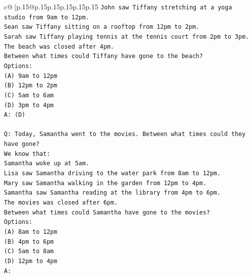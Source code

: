 \documentclass{article}
\begin{document}
{\begin{supertabular}{c@{$\;$}|p{.15\linewidth}@{}p{.15\linewidth}p{.15\linewidth}p{.15\linewidth}p{.15\linewidth}p{.15\linewidth}}
{{{\texttt{John saw Tiffany stretching at a yoga studio from 9am to 12pm.} \\
\texttt{Sean saw Tiffany sitting on a rooftop from 12pm to 2pm.} \\
\texttt{Sarah saw Tiffany playing tennis at the tennis court from 2pm to 3pm.} \\
\texttt{The beach was closed after 4pm.} \\
\texttt{Between what times could Tiffany have gone to the beach?} \\
\texttt{Options:} \\
\texttt{(A) 9am to 12pm} \\
\texttt{(B) 12pm to 2pm} \\
\texttt{(C) 5am to 6am} \\
\texttt{(D) 3pm to 4pm} \\
\texttt{A: (D)} \\
\\ 
\texttt{Q: Today, Samantha went to the movies. Between what times could they have gone?} \\
\texttt{We know that:} \\
\texttt{Samantha woke up at 5am.} \\
\texttt{Lisa saw Samantha driving to the water park from 8am to 12pm.} \\
\texttt{Mary saw Samantha walking in the garden from 12pm to 4pm.} \\
\texttt{Samantha saw Samantha reading at the library from 4pm to 6pm.} \\
\texttt{The movies was closed after 6pm.} \\
\texttt{Between what times could Samantha have gone to the movies?} \\
\texttt{Options:} \\
\texttt{(A) 8am to 12pm} \\
\texttt{(B) 4pm to 6pm} \\
\texttt{(C) 5am to 8am} \\
\texttt{(D) 12pm to 4pm} \\
\texttt{A:} \\
            }
        }
    }
     \\ \\


\end{supertabular}}
\end{document}
